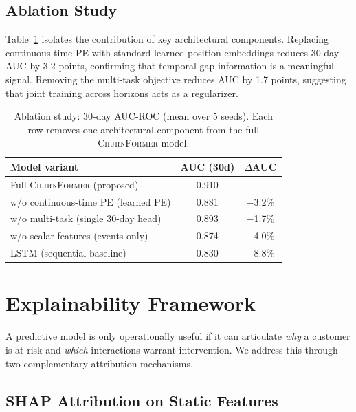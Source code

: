 \documentclass[review, 12pt]{elsarticle}
\newcommand{\model}{\textsc{ChurnFormer}}
\begin{document}
\subsection{Ablation Study}

Table~\ref{tab:ablation} isolates the contribution of key architectural
components.
Replacing continuous-time PE with standard learned position embeddings reduces
30-day AUC by 3.2 points, confirming that temporal gap information is a
meaningful signal.
Removing the multi-task objective reduces AUC by 1.7 points, suggesting that
joint training across horizons acts as a regularizer.

\begin{table}[H]
  \centering
  \caption{Ablation study: 30-day AUC-ROC (mean over 5 seeds).
    Each row removes one architectural component from the full \model{} model.}
  \label{tab:ablation}
  \small
  \begin{tabular}{lcc}
    \toprule
    \textbf{Model variant} & \textbf{AUC (30d)} & \textbf{$\Delta$AUC} \\
    \midrule
    Full \model{} (proposed)              & 0.910 & --- \\
    w/o continuous-time PE (learned PE)   & 0.881 & $-$3.2\% \\
    w/o multi-task (single 30-day head)   & 0.893 & $-$1.7\% \\
    w/o scalar features (events only)     & 0.874 & $-$4.0\% \\
    LSTM (sequential baseline)            & 0.830 & $-$8.8\% \\
    \bottomrule
  \end{tabular}
\end{table}

\section{Explainability Framework}
\label{sec:explain}

A predictive model is only operationally useful if it can articulate
\emph{why} a customer is at risk and \emph{which} interactions warrant
intervention.
We address this through two complementary attribution mechanisms.

\subsection{SHAP Attribution on Static Features}
\end{document}
